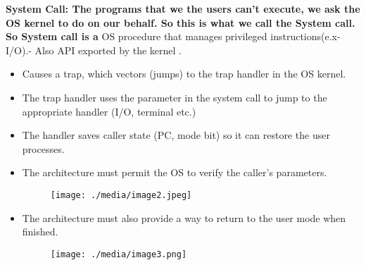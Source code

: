 \documentclass[12pt]{article}
\begin{document}
{\fontsize{18pt}{21.6pt}\selectfont \textbf{System Call: The programs that we the users can’t execute, we ask the OS kernel to do on our behalf. So this is what we call the System call. So System call is a  }OS procedure that manages privileged instructions(e.x- I/O).- Also API exported by the kernel .\par}\par

\begin{itemize}
	\item {\fontsize{18pt}{21.6pt}\selectfont Causes a trap, which vectors (jumps) to the trap handler in the OS kernel.\par}\par

	\item {\fontsize{18pt}{21.6pt}\selectfont The trap handler uses the parameter in the system call to jump to the appropriate handler (I/O, terminal etc.)\par}\par

	\item {\fontsize{18pt}{21.6pt}\selectfont The handler saves caller state (PC, mode bit) so it can restore the user processes.\par}\par

	\item {\fontsize{18pt}{21.6pt}\selectfont The architecture must permit the OS to verify the caller’s parameters.\par}\par




\begin{figure}[H]
\advance\leftskip 0.06in		\texttt{[image: ./media/image2.jpeg]}
\end{figure}



	\item {\fontsize{18pt}{21.6pt}\selectfont The architecture must also provide a way to return to the user mode when finished.\par}\par


\begin{figure}[H]
\advance\leftskip 0.25in		\texttt{[image: ./media/image3.png]}
\end{figure}



\end{itemize}
\end{document}
